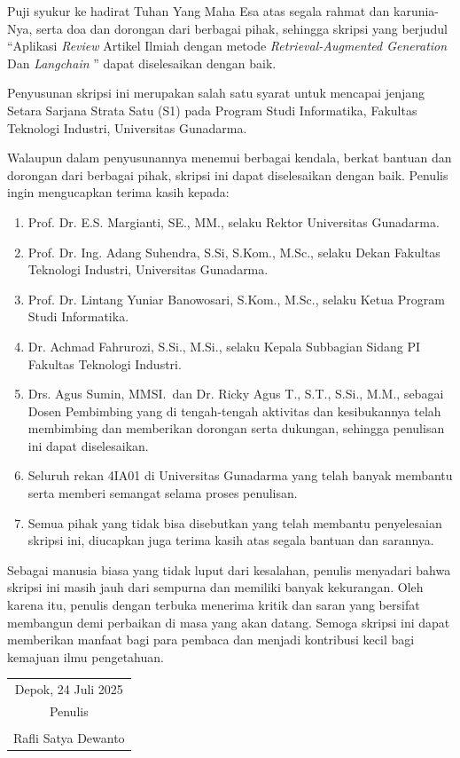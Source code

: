 \documentclass[12pt,oneside,bahasa]{book}
\providecommand{\tabularnewline}{\\}
\newcommand{\Judul}{Aplikasi \textit {Review} Artikel Ilmiah dengan metode \textit {Retrieval-Augmented Generation} Dan \textit {Langchain} }
\newcommand{\Penulis}{Rafli Satya Dewanto}
\newcommand{\Jurusan}{Informatika}
\newcommand{\KoordinatorPI}{Dr. Achmad Fahrurozi, S.Si., M.Si.}
\newcommand{\KetuaJurusan}{Prof. Dr. Lintang Yuniar Banowosari, S.Kom., M.Sc.}
\newcommand{\DosenPembimbingA}{Drs. Agus Sumin, MMSI.}
\newcommand{\DosenPembimbingB}{Dr. Ricky Agus T., S.T., S.Si., M.M.}
\newcommand{\Rektor}{Prof. Dr. E.S. Margianti, SE., MM.}
\newcommand{\Dekan}{Prof. Dr. Ing. Adang Suhendra, S.Si, S.Kom., M.Sc.}
\newcommand{\KotaPenulis}{Depok}
\newcommand{\BlnThn}{24 Juli 2025}
\begin{document}
\thispagestyle{plain}

Puji syukur ke hadirat Tuhan Yang Maha Esa atas segala rahmat dan
karunia-Nya, serta doa dan dorongan dari berbagai pihak, sehingga
skripsi yang berjudul ``\Judul'' dapat diselesaikan dengan baik.

Penyusunan skripsi ini merupakan salah satu syarat untuk mencapai
jenjang Setara Sarjana Strata Satu (S1) pada Program Studi Informatika,
Fakultas Teknologi Industri, Universitas Gunadarma.

Walaupun dalam penyusunannya menemui berbagai kendala, berkat bantuan
dan dorongan dari berbagai pihak, skripsi ini dapat diselesaikan dengan
baik. Penulis ingin mengucapkan terima kasih kepada: 
\begin{enumerate}
\item \Rektor, selaku Rektor Universitas Gunadarma.
\item \Dekan, selaku Dekan Fakultas Teknologi Industri, Universitas Gunadarma.
\item \KetuaJurusan , selaku Ketua Program Studi \Jurusan.
\item \KoordinatorPI, selaku Kepala Subbagian Sidang PI Fakultas Teknologi
Industri.
\item \DosenPembimbingA\ dan \DosenPembimbingB, sebagai Dosen Pembimbing
yang di tengah-tengah aktivitas dan kesibukannya telah membimbing
dan memberikan dorongan serta dukungan, sehingga penulisan ini dapat
diselesaikan.
\item Seluruh rekan 4IA01 di Universitas Gunadarma yang telah banyak
membantu serta memberi semangat selama proses penulisan. 
\item Semua pihak yang tidak bisa disebutkan yang telah membantu penyelesaian
skripsi ini, diucapkan juga terima kasih atas segala bantuan dan sarannya. 
\end{enumerate}
\indent

Sebagai manusia biasa yang tidak luput dari kesalahan, penulis menyadari
bahwa skripsi ini masih jauh dari sempurna dan memiliki banyak kekurangan.
Oleh karena itu, penulis dengan terbuka menerima kritik dan saran
yang bersifat membangun demi perbaikan di masa yang akan datang. Semoga
skripsi ini dapat memberikan manfaat bagi para pembaca dan menjadi
kontribusi kecil bagi kemajuan ilmu pengetahuan.

\begin{singlespace}
\vspace*{15mm}


\end{singlespace}\begin{flushright}
\begin{tabular}{c}
\KotaPenulis, \BlnThn\vspace{10pt}\tabularnewline
Penulis\tabularnewline
\vspace*{25mm}\tabularnewline
\Penulis\tabularnewline
\end{tabular}
\par\end{flushright}
\end{document}

